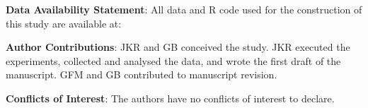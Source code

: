 \documentclass[12pt]{article}
\begin{document}
\par\noindent \textbf{Data Availability Statement}: All data and R code used for the construction of this study are available at: 
\vspace{\baselineskip}

\par\noindent \textbf{Author Contributions}: JKR and GB conceived the study. JKR executed the experiments, collected and analysed the data, and wrote the first draft of the manuscript. GFM and GB contributed to manuscript revision.
\vspace{\baselineskip}

\par\noindent \textbf{Conflicts of Interest}: The authors have no conflicts of interest to declare.

\vspace{\baselineskip}
\vspace{\baselineskip}
\end{document}
